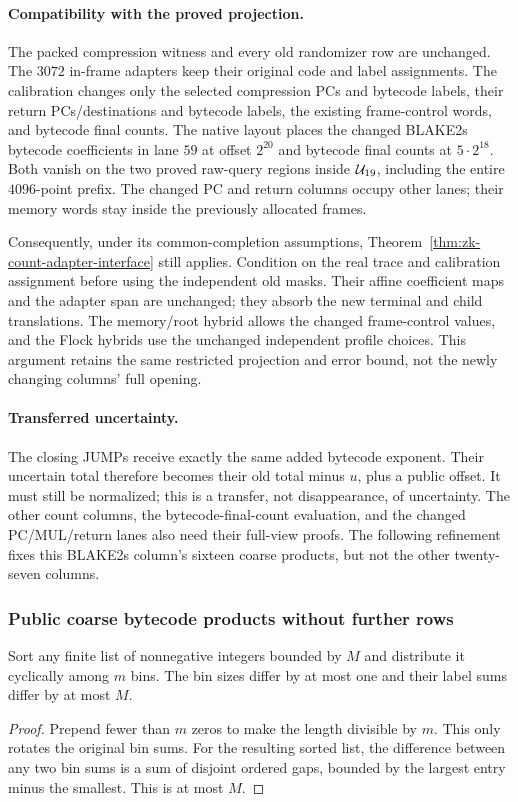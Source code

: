 \paragraph{Compatibility with the proved projection.} The packed compression witness and every old randomizer row are unchanged. The $3072$ in-frame adapters keep their original code and label assignments. The calibration changes only the selected compression PCs and bytecode labels, their return PCs/destinations and bytecode labels, the existing frame-control words, and bytecode final counts. The native layout places the changed BLAKE2s bytecode coefficients in lane $59$ at offset $2^{20}$ and bytecode final counts at $5\cdot2^{18}$. Both vanish on the two proved raw-query regions inside $\mathcal{U}_{19}$, including the entire $4096$-point prefix. The changed PC and return columns occupy other lanes; their memory words stay inside the previously allocated frames.

Consequently, under its common-completion assumptions, Theorem~\ref{thm:zk-count-adapter-interface} still applies. Condition on the real trace and calibration assignment before using the independent old masks. Their affine coefficient maps and the adapter span are unchanged; they absorb the new terminal and child translations. The memory/root hybrid allows the changed frame-control values, and the Flock hybrids use the unchanged independent profile choices. This argument retains the same restricted projection and error bound, not the newly changing columns' full opening.

\paragraph{Transferred uncertainty.} The closing JUMPs receive exactly the same added bytecode exponent. Their uncertain total therefore becomes their old total minus $u$, plus a public offset. It must still be normalized; this is a transfer, not disappearance, of uncertainty. The other count columns, the bytecode-final-count evaluation, and the changed PC/MUL/return lanes also need their full-view proofs. The following refinement fixes this BLAKE2s column's sixteen coarse products, but not the other twenty-seven columns.

\subsubsection{Public coarse bytecode products without further rows}

\begin{lemma}\label{lem:zk-cyclic-label-balance}
Sort any finite list of nonnegative integers bounded by $M$ and distribute it cyclically among $m$ bins. The bin sizes differ by at most one and their label sums differ by at most $M$.
\end{lemma}
\begin{proof}
Prepend fewer than $m$ zeros to make the length divisible by $m$. This only rotates the original bin sums. For the resulting sorted list, the difference between any two bin sums is a sum of disjoint ordered gaps, bounded by the largest entry minus the smallest. This is at most $M$.
\end{proof}


